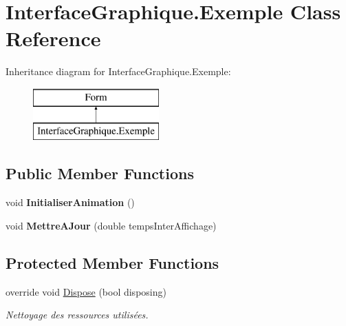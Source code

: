 \hypertarget{class_interface_graphique_1_1_exemple}{}\section{Interface\+Graphique.\+Exemple Class Reference}
\label{class_interface_graphique_1_1_exemple}
Inheritance diagram for Interface\+Graphique.\+Exemple\+:\begin{figure}[H]
\begin{center}
\leavevmode
\includegraphics[height=2.000000cm]{class_interface_graphique_1_1_exemple}
\end{center}
\end{figure}
\subsection*{Public Member Functions}
\begin{DoxyCompactItemize}
\item 
\hypertarget{class_interface_graphique_1_1_exemple_aa04656d2a59273ce0dc560ecdba7b00d}{}void {\bfseries Initialiser\+Animation} ()\label{class_interface_graphique_1_1_exemple_aa04656d2a59273ce0dc560ecdba7b00d}

\item 
\hypertarget{class_interface_graphique_1_1_exemple_a8816bbbe8610e3bb1276b61ef7cf8a43}{}void {\bfseries Mettre\+A\+Jour} (double temps\+Inter\+Affichage)\label{class_interface_graphique_1_1_exemple_a8816bbbe8610e3bb1276b61ef7cf8a43}

\end{DoxyCompactItemize}
\subsection*{Protected Member Functions}
\begin{DoxyCompactItemize}
\item 
override void \hyperlink{class_interface_graphique_1_1_exemple_a9e65f10c012fdb43a3ac2a086e45b39d}{Dispose} (bool disposing)
\begin{DoxyCompactList}\small\item\em Nettoyage des ressources utilisées. \end{DoxyCompactList}\end{DoxyCompactItemize}


